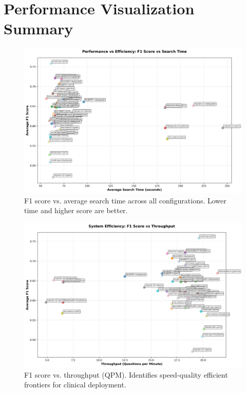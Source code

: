 \section{Performance Visualization Summary}
\begin{figure}[!htbp]
  \centering
  \includegraphics[width=\textwidth]{chap4_results/images/time_vs_score.png}
  \caption{F1 score vs. average search time across all configurations. Lower time and higher score are better.}
  \label{fig:time_vs_score}
\end{figure}

\begin{figure}[!htbp]
  \centering
  \includegraphics[width=\textwidth]{chap4_results/images/quality_vs_throughput.png}
  \caption{F1 score vs. throughput (QPM). Identifies speed-quality efficient frontiers for clinical deployment.}
  \label{fig:quality_vs_throughput}
\end{figure}

